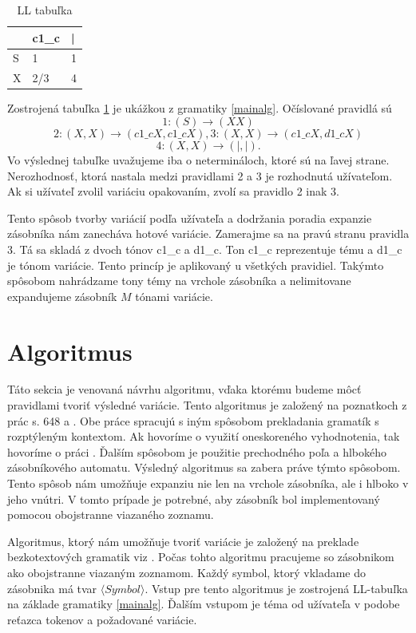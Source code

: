 \begin{table}[!ht]
\label{tabulLL}
\centering
\begin{tabular}{|l|l|l|}
\hline
  & c1\_c & | \\ \hline
S & 1     & 1 \\ \hline
X & 2/3   & 4\\ \hline
\end{tabular}
\caption{LL tabuľka}
\end{table}

Zostrojená tabuľka \ref{tabulLL} je ukážkou z gramatiky \ref{mainalg}. Očíslované pravidlá sú $$1: (S) \rightarrow (XX)$$$$2: (X,X) \rightarrow (c1\_cX, c1\_cX),3: (X,X) \rightarrow (c1\_cX, d1\_cX)$$$$4:(X,X) \rightarrow (|,|).$$ Vo výslednej tabuľke uvažujeme iba o netermináloch, ktoré sú na ľavej strane. Nerozhodnosť, ktorá nastala medzi pravidlami 2 a 3 je rozhodnutá užívateľom. Ak si užívateľ zvolil variáciu opakovaním, zvolí sa pravidlo 2 inak 3.

Tento spôsob tvorby variácií podľa užívateľa a dodržania poradia expanzie zásobníka nám zanecháva hotové variácie. Zamerajme sa na pravú stranu pravidla 3. Tá sa skladá z dvoch tónov c1\_c a d1\_c. Ton c1\_c reprezentuje tému a d1\_c je tónom variácie. Tento princíp je aplikovaný u všetkých pravidiel. Takýmto spôsobom nahrádzame tony témy na vrchole zásobníka a nelimitovane expandujeme zásobník $M$ tónami variácie.

\section{Algoritmus}
\label{sec:alg}
Táto sekcia je venovaná návrhu algoritmu, vďaka ktorému budeme môcť pravidlami tvoriť výsledné variácie. Tento algoritmus je založený na poznatkoch z prác s. 648 \cite{FITPUB10498} a \cite{tablemusic}. Obe práce spracujú s iným spôsobom prekladania gramatík s rozptýleným kontextom. Ak hovoríme o využití oneskoreného vyhodnotenia, tak hovoríme o práci \cite{tablemusic}. Ďalším spôsobom je použitie prechodného poľa a hlbokého zásobníkového automatu. Výsledný algoritmus sa zabera práve týmto spôsobom.
Tento spôsob nám umožňuje expanziu nie len na vrchole zásobníka, ale i hlboko v jeho vnútri. V tomto prípade je potrebné, aby zásobník bol implementovaný pomocou obojstranne viazaného zoznamu.

Algoritmus, ktorý nám umožňuje tvoriť variácie je založený na preklade bezkotextových gramatik viz \cite{FITPUB10524}. Počas tohto algoritmu pracujeme so zásobnikom ako obojstranne viazaným zoznamom. Každý symbol, ktorý vkladame do zásobnika má tvar $ \langle Symbol \rangle $. Vstup pre tento algoritmus je zostrojená LL-tabuľka na základe gramatiky \ref{mainalg}. Ďalším vstupom je téma od užívateľa v podobe reťazca tokenov a požadované variácie.

